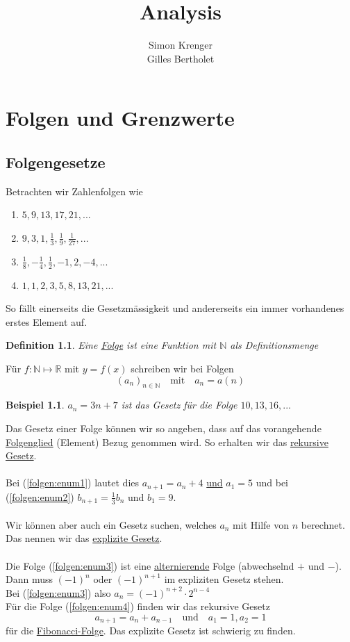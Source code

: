 \documentclass{report}
\title{Analysis}
\author{Simon Krenger\\Gilles Bertholet}
\newtheorem{mydef}{Definition}
\newtheorem{myexample}{Beispiel}
\begin{document}
\maketitle
\chapter{Folgen und Grenzwerte}
\section{Folgengesetze}
Betrachten wir Zahlenfolgen wie
\begin{enumerate}
\item $5, 9, 13, 17, 21, ...$ \label{folgen:enum1}
\item $9, 3, 1, \frac{1}{3}, \frac{1}{9}, \frac{1}{27}, ...$ \label{folgen:enum2}
\item $\frac{1}{8}, -\frac{1}{4}, \frac{1}{2}, -1, 2, -4, ... $ \label{folgen:enum3}
\item $1, 1, 2, 3, 5, 8, 13, 21, ...$ \label{folgen:enum4}
\end{enumerate}
So fällt einerseits die Gesetzmässigkeit und andererseits ein immer vorhandenes erstes Element auf.
\begin{mydef}Eine \underline{Folge} ist eine Funktion mit $\mathbb{N}$ als Definitionsmenge\end{mydef}
Für $f: \mathbb{N} \mapsto \mathbb{R}$ mit $y = f(x)$ schreiben wir bei Folgen
\begin{equation}(a_n)_{n \in \mathbb{N}} \quad \mbox{mit} \quad a_n=a(n)\end{equation}
\begin{myexample}$a_n = 3n + 7$ ist das Gesetz für die Folge $10, 13, 16, ...$\end{myexample}
Das Gesetz einer Folge können wir so angeben, dass auf das vorangehende \underline{Folgenglied} (Element) Bezug genommen wird. So erhalten wir das \underline{rekursive Gesetz}.
\\\\
Bei (\ref{folgen:enum1}) lautet dies $a_{n+1} = a_n + 4$ \underline{und} $a_1 = 5$ und bei (\ref{folgen:enum2}) $b_{n+1}=\frac{1}{3}b_n$ und $b_1=9$.
\\\\
Wir können aber auch ein Gesetz suchen, welches $a_n$ mit Hilfe von $n$ berechnet. Das nennen wir das \underline{explizite Gesetz}.
\\\\
Die Folge (\ref{folgen:enum3}) ist eine \underline{alternierende} Folge (abwechselnd $+$ und $-$). Dann muss $(-1)^n$ oder $(-1)^{n+1}$ im expliziten Gesetz stehen.\\
Bei (\ref{folgen:enum3}) also $a_n = (-1)^{n+2} \cdot 2^{n-4}$\\
Für die Folge  (\ref{folgen:enum4}) finden wir das rekursive Gesetz
\begin{equation}a_{n+1} = a_n + a_{n-1} \quad \mbox{und} \quad a_1=1, a_2=1\end{equation}
für die \underline{Fibonacci-Folge}. Das explizite Gesetz ist schwierig zu finden.
\end{document}
